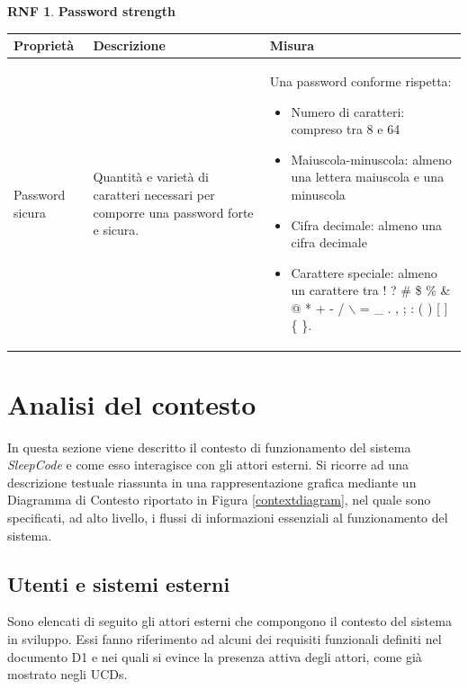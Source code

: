 \documentclass[11pt, a4paper]{article}
\theoremstyle{definition} %
\newtheorem{nonfuncreq}{RNF} %
\begin{document}
\newpage
\begin{nonfuncreq}
    \textbf{Password strength }
    \begin{center}
        \footnotesize
        \begin{tabularx}{\textwidth}{|X||X||X|}
            \hline
            \cellcolor{red!70}Proprietà & \cellcolor{red!70}Descrizione & \cellcolor{red!70}Misura\\
            \hline
            Password sicura & Quantità e varietà di caratteri necessari per comporre una password forte e sicura. & Una password conforme rispetta:
            \begin{itemize}[leftmargin = *]
                \item Numero di caratteri: compreso tra 8 e 64
                \item Maiuscola-minuscola: almeno una lettera maiuscola e una minuscola
                \item Cifra decimale: almeno una cifra decimale
                \item Carattere speciale: almeno un carattere tra  ! ? \# \$ \% \& @ * + - / $\backslash$ = \_ . , ; : ( ) [ ] \{ \}.
            \end{itemize}\\
            \hline
        \end{tabularx}
    \end{center}
\end{nonfuncreq}





\newpage
\section{Analisi del contesto}
In questa sezione viene descritto il contesto di funzionamento del sistema
\textit{SleepCode} e come esso interagisce con gli attori esterni. Si
ricorre ad una descrizione testuale riassunta in una rappresentazione
grafica mediante un Diagramma di Contesto riportato in
Figura \ref{contextdiagram}, nel quale sono specificati, ad alto livello,
i flussi di informazioni essenziali al funzionamento del sistema.

\subsection{Utenti e sistemi esterni} %
Sono elencati di seguito gli attori esterni che compongono il contesto
del sistema in sviluppo. Essi fanno riferimento ad alcuni dei requisiti
funzionali definiti nel documento D1 e nei quali si evince la presenza
attiva degli attori, come già mostrato negli UCDs.
\end{document}
